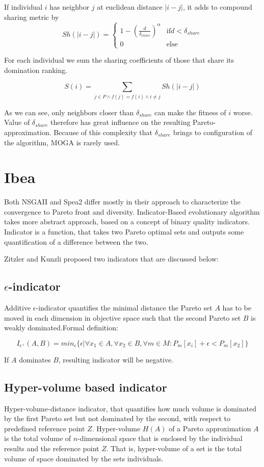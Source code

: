 \documentclass[12pt,oneside]{fithesis2}
\begin{document}
If individual $i$ has neighbor $j$ at euclidean distance $|i-j|$, it adds to compound sharing metric by
$$Sh(|i-j|) = \begin{cases} 
    1 - (\frac{d}{\delta_{share}})^\alpha & \text{if}  d < \delta_{share}\\
    0 & \text{else}
\end{cases}$$

For each individual we sum the sharing coefficients of those that share its domination ranking.

$$ S(i) = \sum\limits_{j \in P \land f(j) =f(i) \land i \neq j} Sh(|i-j|) $$

As we can see, only neighbors closer than $\delta_{share}$ can make the fitness of $i$ worse. Value of $\delta_{share}$ therefore has great influence on the resulting Pareto-approximation. Because of this complexity that $\delta_{share}$ brings to configuration of the algorithm, MOGA is rarely used.

\section{Ibea}
Both NSGAII and Spea2 differ mostly in their approach to characterize the convergence to Pareto front and diversity. 
Indicator-Based evolutionary algorithm \cite{zitzler2004indicator} takes more abstract approach, based on a concept of binary quality indicators.
Indicator is a function, that takes two Pareto optimal sets and outputs some quantification of a difference between the two.

Zitzler and Kunzli proposed two indicators that are discussed below:

\subsection{$\epsilon$-indicator}   
Additive $\epsilon$-indicator quantifies the minimal distance the Pareto set $A$ has to be moved in each dimension in objective space such that the second Pareto set $B$ is weakly dominated.Formal definition:

$$I_{\epsilon^+}(A,B) = min_\epsilon\{\epsilon |\forall x_1 \in A, \forall x_2 \in B, \forall m \in M: P_m[x_i] + \epsilon < P_m[x_2] \} $$

If $A$ dominates $B$, resulting indicator will be negative.

\subsection{Hyper-volume based indicator}   
Hyper-volume-distance indicator, that quantifies how much volume is dominated by the first Pareto set but not dominated by the second, with respect to predefined reference point $Z$. 
Hyper-volume $H(A)$ of a Pareto approximation $A$ is the total volume of $n$-dimensional space that is enclosed by the individual results and the reference point $Z$. That is, hyper-volume of a set is the total volume of space dominated by the sets individuals.
\end{document}
